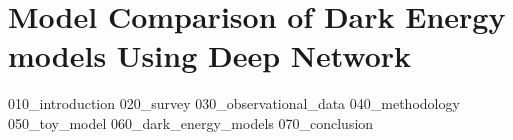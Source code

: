 \chapter{Model Comparison of Dark Energy models Using Deep Network}
{010_introduction}
{020_survey}
{030_observational_data}
{040_methodology}
{050_toy_model}
{060_dark_energy_models}
{070_conclusion}

